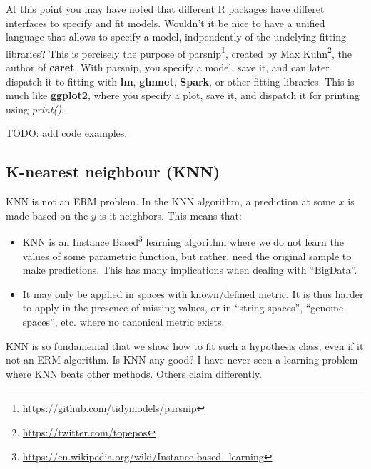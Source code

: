 \documentclass[]{book}
\newenvironment{Shaded}{\begin{snugshade}}{\end{snugshade}}
\newcommand{\CommentTok}[1]{\textcolor[rgb]{0.56,0.35,0.01}{\textit{#1}}}
\newcommand{\DataTypeTok}[1]{\textcolor[rgb]{0.13,0.29,0.53}{#1}}
\newcommand{\DecValTok}[1]{\textcolor[rgb]{0.00,0.00,0.81}{#1}}
\newcommand{\FloatTok}[1]{\textcolor[rgb]{0.00,0.00,0.81}{#1}}
\newcommand{\KeywordTok}[1]{\textcolor[rgb]{0.13,0.29,0.53}{\textbf{#1}}}
\newcommand{\NormalTok}[1]{#1}
\newcommand{\OperatorTok}[1]{\textcolor[rgb]{0.81,0.36,0.00}{\textbf{#1}}}
\newcommand{\StringTok}[1]{\textcolor[rgb]{0.31,0.60,0.02}{#1}}
\providecommand{\tightlist}{%
  \setlength{\itemsep}{0pt}\setlength{\parskip}{0pt}}
\renewcommand{\href}[2]{#2\footnote{\url{#1}}}
\theoremstyle{definition}
\theoremstyle{definition}
\theoremstyle{definition}
\theoremstyle{remark}
\begin{document}
At this point you may have noted that different R packages have differet interfaces to specify and fit models.
Wouldn't it be nice to have a unified language that allows to specify a model, indpendently of the undelying fitting libraries?
This is percisely the purpose of \href{https://github.com/tidymodels/parsnip}{parsnip}, created by \href{https://twitter.com/topepos}{Max Kuhn}, the author of \textbf{caret}.
With parsnip, you specify a model, save it, and can later dispatch it to fitting with \textbf{lm}, \textbf{glmnet}, \textbf{Spark}, or other fitting libraries.
This is much like \textbf{ggplot2}, where you specify a plot, save it, and dispatch it for printing using \emph{print()}.

TODO: add code examples.

\hypertarget{k-nearest-neighbour-knn}{%
\subsection{K-nearest neighbour (KNN)}\label{k-nearest-neighbour-knn}}

KNN is not an ERM problem.
In the KNN algorithm, a prediction at some \(x\) is made based on the \(y\) is it neighbors.
This means that:

\begin{itemize}
\tightlist
\item
  KNN is an \href{https://en.wikipedia.org/wiki/Instance-based_learning}{Instance Based} learning algorithm where we do not learn the values of some parametric function, but rather, need the original sample to make predictions. This has many implications when dealing with ``BigData''.
\item
  It may only be applied in spaces with known/defined metric. It is thus harder to apply in the presence of missing values, or in ``string-spaces'', ``genome-spaces'', etc. where no canonical metric exists.
\end{itemize}

KNN is so fundamental that we show how to fit such a hypothesis class, even if it not an ERM algorithm.
Is KNN any good?
I have never seen a learning problem where KNN beats other methods. Others claim differently.

\begin{Shaded}
\end{Shaded}
\end{document}
